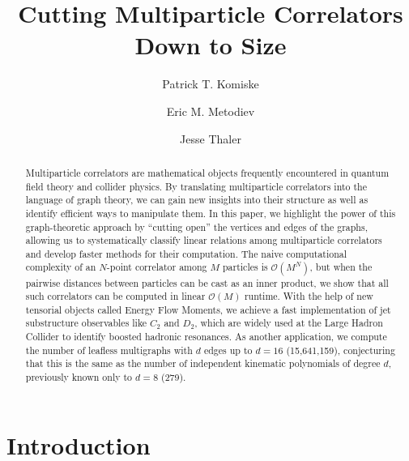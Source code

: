 \documentclass[aps,prd,floatfix,preprintnumbers,twocolumn,groupedaddress,nofootinbib,longbibliography,10pt]{revtex4-1}
\renewcommand{\O}{\mathcal{O}}
\begin{document}
\title{Cutting Multiparticle Correlators Down to Size}

\author{Patrick T. Komiske}

\author{Eric M. Metodiev}

\author{Jesse Thaler}



\begin{abstract}
%
Multiparticle correlators are mathematical objects frequently encountered in quantum field theory and collider physics.
%
By translating multiparticle correlators into the language of graph theory, we can gain new insights into their structure as well as identify efficient ways to manipulate them.
%
In this paper, we highlight the power of this graph-theoretic approach by ``cutting open'' the vertices and edges of the graphs, allowing us to systematically classify linear relations among multiparticle correlators and develop faster methods for their computation.
%
The naive computational complexity of an $N$-point correlator among $M$ particles is $\O(M^N)$, but when the pairwise distances between particles can be cast as an inner product, we show that all such correlators can be computed in linear $\O(M)$ runtime.
%
With the help of new tensorial objects called Energy Flow Moments, we achieve a fast implementation of jet substructure observables like $C_2$ and $D_2$, which are widely used at the Large Hadron Collider to identify boosted hadronic resonances.
%
As another application, we compute the number of leafless multigraphs with $d$ edges up to $d = 16$ (15,641,159), conjecturing that this is the same as the number of independent kinematic polynomials of degree $d$, previously known only to $d=8$ (279).
%
\end{abstract}


\flushbottom

\maketitle

{\small\tableofcontents}
\newpage



\section{Introduction}
\label{sec:intro}
\end{document}

